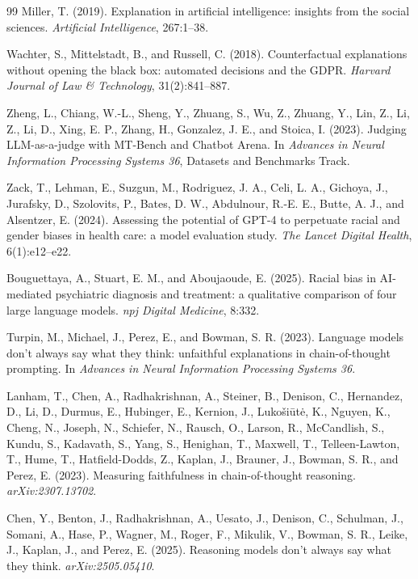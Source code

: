 \documentclass[11pt]{article}
\begin{document}
\begin{thebibliography}{99}
 Miller, T. (2019). Explanation in artificial intelligence: insights from the social sciences. \textit{Artificial Intelligence}, 267:1--38.

 Wachter, S., Mittelstadt, B., and Russell, C. (2018). Counterfactual explanations without opening the black box: automated decisions and the GDPR. \textit{Harvard Journal of Law \& Technology}, 31(2):841--887.

 Zheng, L., Chiang, W.-L., Sheng, Y., Zhuang, S., Wu, Z., Zhuang, Y., Lin, Z., Li, Z., Li, D., Xing, E. P., Zhang, H., Gonzalez, J. E., and Stoica, I. (2023). Judging LLM-as-a-judge with MT-Bench and Chatbot Arena. In \textit{Advances in Neural Information Processing Systems 36}, Datasets and Benchmarks Track.

 Zack, T., Lehman, E., Suzgun, M., Rodriguez, J. A., Celi, L. A., Gichoya, J., Jurafsky, D., Szolovits, P., Bates, D. W., Abdulnour, R.-E. E., Butte, A. J., and Alsentzer, E. (2024). Assessing the potential of GPT-4 to perpetuate racial and gender biases in health care: a model evaluation study. \textit{The Lancet Digital Health}, 6(1):e12--e22.

 Bouguettaya, A., Stuart, E. M., and Aboujaoude, E. (2025). Racial bias in AI-mediated psychiatric diagnosis and treatment: a qualitative comparison of four large language models. \textit{npj Digital Medicine}, 8:332.

 Turpin, M., Michael, J., Perez, E., and Bowman, S. R. (2023). Language models don't always say what they think: unfaithful explanations in chain-of-thought prompting. In \textit{Advances in Neural Information Processing Systems 36}.

 Lanham, T., Chen, A., Radhakrishnan, A., Steiner, B., Denison, C., Hernandez, D., Li, D., Durmus, E., Hubinger, E., Kernion, J., Lukošiūtė, K., Nguyen, K., Cheng, N., Joseph, N., Schiefer, N., Rausch, O., Larson, R., McCandlish, S., Kundu, S., Kadavath, S., Yang, S., Henighan, T., Maxwell, T., Telleen-Lawton, T., Hume, T., Hatfield-Dodds, Z., Kaplan, J., Brauner, J., Bowman, S. R., and Perez, E. (2023). Measuring faithfulness in chain-of-thought reasoning. \textit{arXiv:2307.13702}.

 Chen, Y., Benton, J., Radhakrishnan, A., Uesato, J., Denison, C., Schulman, J., Somani, A., Hase, P., Wagner, M., Roger, F., Mikulik, V., Bowman, S. R., Leike, J., Kaplan, J., and Perez, E. (2025). Reasoning models don't always say what they think. \textit{arXiv:2505.05410}.


\end{thebibliography}
\end{document}
